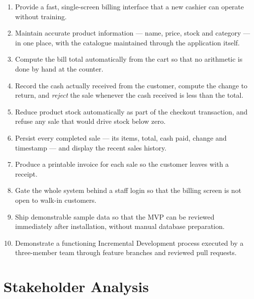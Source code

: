 \documentclass[11pt,a4paper]{article}
\begin{document}
\begin{enumerate}
  \item Provide a fast, single-screen billing interface that a new cashier can operate
        without training.
  \item Maintain accurate product information --- name, price, stock and category --- in one
        place, with the catalogue maintained through the application itself.
  \item Compute the bill total automatically from the cart so that no arithmetic is done by
        hand at the counter.
  \item Record the cash actually received from the customer, compute the change to return,
        and \emph{reject} the sale whenever the cash received is less than the total.
  \item Reduce product stock automatically as part of the checkout transaction, and refuse
        any sale that would drive stock below zero.
  \item Persist every completed sale --- its items, total, cash paid, change and timestamp ---
        and display the recent sales history.
  \item Produce a printable invoice for each sale so the customer leaves with a receipt.
  \item Gate the whole system behind a staff login so that the billing screen is not open to
        walk-in customers.
  \item Ship demonstrable sample data so that the MVP can be reviewed immediately after
        installation, without manual database preparation.
  \item Demonstrate a functioning Incremental Development process executed by a
        three-member team through feature branches and reviewed pull requests.
\end{enumerate}

\section{Stakeholder Analysis}
\end{document}
